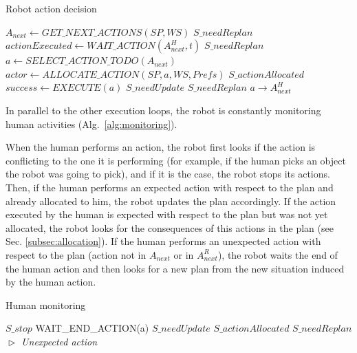 \documentclass[english,a4paper,11pt,twoside]{StyleThese}
\begin{document}
\begin{algorithm}
\caption{Robot action decision}
\label{alg:mainExec}
\begin{algorithmic}
\STATE $A_{next} \leftarrow GET\_NEXT\_ACTIONS(SP, WS)$
\STATE $S\_needReplan$
\STATE $actionExecuted \leftarrow WAIT\_ACTION(A^H_{next}, t)$
\STATE $S\_needReplan$
\ENDIF 
\ELSE
\STATE $a \leftarrow SELECT\_ACTION\_TODO(A_{next})$
\STATE $actor \leftarrow ALLOCATE\_ACTION(SP, a, WS, Prefs)$
\STATE $S\_actionAllocated$
\ENDIF
{}
\STATE $success \leftarrow EXECUTE(a)$
\STATE $S\_needUpdate$
\ELSE 
\STATE $S\_needReplan$
\ENDIF
{}
\STATE $a \rightarrow A^H_{next}$
\ENDIF
\ENDIF
\ENDWHILE
\end{algorithmic}
\end{algorithm} 

\newpage
In parallel to the other execution loops, the robot is constantly monitoring human activities (Alg.~\ref{alg:monitoring}).


When the human performs an action, the robot first looks if the action is conflicting to the one it is performing (for example, if the human picks an object the robot was going to pick), and if it is the case, the robot stops its actions.  
Then, if the human performs an expected action with respect to the plan and already allocated to him, the robot updates the plan accordingly. If the action executed by the human is expected with respect to the plan but was not yet allocated, the robot looks for the consequences of this actions in the plan (see Sec. \ref{subsec:allocation}).
If the human performs an unexpected action with respect to the plan (action not in $A_{next}$ or in $A^R_{next}$), the robot waits the end of the human action and then looks for a new plan from the new situation induced by the human action.

\begin{algorithm}
\caption{Human monitoring}
\label{alg:monitoring}
\begin{algorithmic}
\STATE $S\_stop$
\ENDIF
\STATE WAIT\_END\_ACTION(a)
\STATE $S\_needUpdate$
\STATE $S\_actionAllocated$
\ELSE 
\STATE $S\_needReplan$ \hfill \textit{$\vartriangleright$ Unexpected action}
\ENDIF
\ENDIF
\ENDWHILE
\end{algorithmic}
\end{algorithm}
\end{document}
